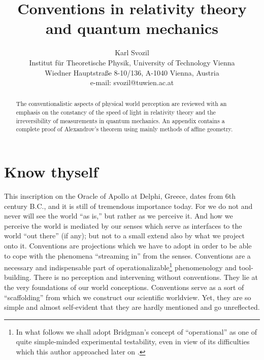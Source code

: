 \renewcommand{\baselinestretch}{2}





\title{Conventions in relativity theory and quantum mechanics}
\author{Karl Svozil\\
 {\small Institut f\"ur Theoretische Physik, University of Technology Vienna }     \\
  {\small Wiedner Hauptstra\ss e 8-10/136,}
  {\small A-1040 Vienna, Austria   }            \\
  {\small e-mail: svozil@tuwien.ac.at}}
\date{ }
\maketitle


\begin{abstract}
The conventionalistic aspects of physical world perception are reviewed
with an emphasis on the constancy of the speed of light in relativity theory
and the irreversibility of measurements in quantum mechanics.
An appendix contains a complete proof of Alexandrov's theorem
using mainly methods of affine geometry.
\end{abstract}


\section{Know thyself}
This inscription on the Oracle of Apollo at Delphi, Greece,
dates from 6th century B.C., and it is still of tremendous importance
today.
For we do not and never will see the world ``as is,'' but rather as we
perceive it.
And how we perceive the world is mediated by our senses which serve
as interfaces to the world ``out there'' (if any); but
not to a small extend also by what we project onto it.
Conventions are projections which we have to adopt in order to be able
to cope with the phenomena ``streaming in'' from the senses.
Conventions are a necessary and indispensable part of
operationalizable\footnote{
In what follows we shall adopt Bridgman's concept of ``operational''
as one of quite simple-minded experimental testability,
even in view of its difficulties which this author approached later on
\cite{bridgman27,bridgman,bridgman36,bridgman50,bridgman52}.}
phenomenology and tool-building.
There is no perception and intervening without conventions.
They lie at
the very foundations of our world conceptions.
Conventions serve as a sort of ``scaffolding'' from which
we construct our scientific worldview.
Yet, they are so simple and almost self-evident that they are hardly
mentioned and go unreflected.

